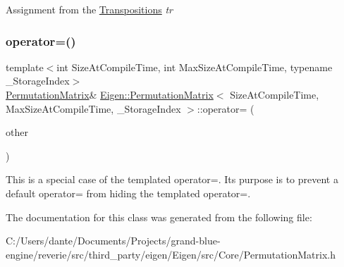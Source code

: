 Assignment from the \mbox{\hyperlink{class_eigen_1_1_transpositions}{Transpositions}} {\itshape tr} \mbox{\label{class_eigen_1_1_permutation_matrix_a09357ca4fddb406c55c2431f36552ada}} 
\subsubsection{\texorpdfstring{operator=()}{operator=()}\hspace{0.1cm}{\footnotesize\ttfamily [3/3]}}
{\footnotesize\ttfamily template$<$int Size\+At\+Compile\+Time, int Max\+Size\+At\+Compile\+Time, typename \+\_\+\+Storage\+Index$>$ \\
\mbox{\hyperlink{class_eigen_1_1_permutation_matrix}{Permutation\+Matrix}}\& \mbox{\hyperlink{class_eigen_1_1_permutation_matrix}{Eigen\+::\+Permutation\+Matrix}}$<$ Size\+At\+Compile\+Time, Max\+Size\+At\+Compile\+Time, \+\_\+\+Storage\+Index $>$\+::operator= (\begin{DoxyParamCaption}\item[{const \mbox{\hyperlink{class_eigen_1_1_permutation_matrix}{Permutation\+Matrix}}$<$ Size\+At\+Compile\+Time, Max\+Size\+At\+Compile\+Time, \+\_\+\+Storage\+Index $>$ \&}]{other }\end{DoxyParamCaption})\hspace{0.3cm}{\ttfamily [inline]}}

This is a special case of the templated operator=. Its purpose is to prevent a default operator= from hiding the templated operator=. 

The documentation for this class was generated from the following file\+:\begin{DoxyCompactItemize}
\item 
C\+:/\+Users/dante/\+Documents/\+Projects/grand-\/blue-\/engine/reverie/src/third\+\_\+party/eigen/\+Eigen/src/\+Core/Permutation\+Matrix.\+h\end{DoxyCompactItemize}

